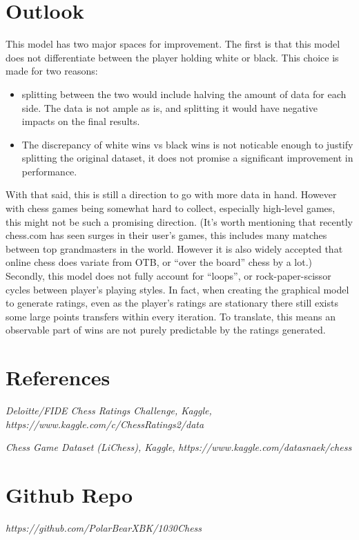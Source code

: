 \documentclass[12pt, letterpaper]{article}
\begin{document}
\begin{multicols}{2}
\section*{Outlook}

This model has two major spaces for improvement. The first is that this model does not differentiate between the player holding white or black. This choice is made for two reasons: 

\begin{itemize}
\item splitting between the two would include halving the amount of data for each side. The data is not ample as is, and splitting it would have negative impacts on the final results.
\item The discrepancy of white wins vs black wins is not noticable enough to justify splitting the original dataset, it does not promise a significant improvement in performance.
\end{itemize}

With that said, this is still a direction to go with more data in hand. However with chess games being somewhat hard to collect, especially high-level games, this might not be such a promising direction. (It’s worth mentioning that recently chess.com has seen surges in their user’s games, this includes many matches between top grandmasters in the world. However it is also widely accepted that online chess does variate from OTB, or “over the board” chess by a lot.)
Secondly, this model does not fully account for “loops”, or rock-paper-scissor cycles between player’s playing styles. In fact, when creating the graphical model to generate ratings, even as the player’s ratings are stationary there still exists some large points transfers within every iteration. To translate, this means an observable part of wins are not purely predictable by the ratings generated.


\section*{References}
\begin{small}
\begin{flushleft}
	\textit{Deloitte/FIDE Chess Ratings Challenge, Kaggle,}
	\textit{https://www.kaggle.com/c/ChessRatings2/data}
	
	\textit{Chess Game Dataset (LiChess), Kaggle,} 
	\textit{https://www.kaggle.com/datasnaek/chess}
\end{flushleft}
\end{small}


\section*{Github Repo}
	\textit{https://github.com/PolarBearXBK/1030Chess}
\end{multicols}	

\end{document}
